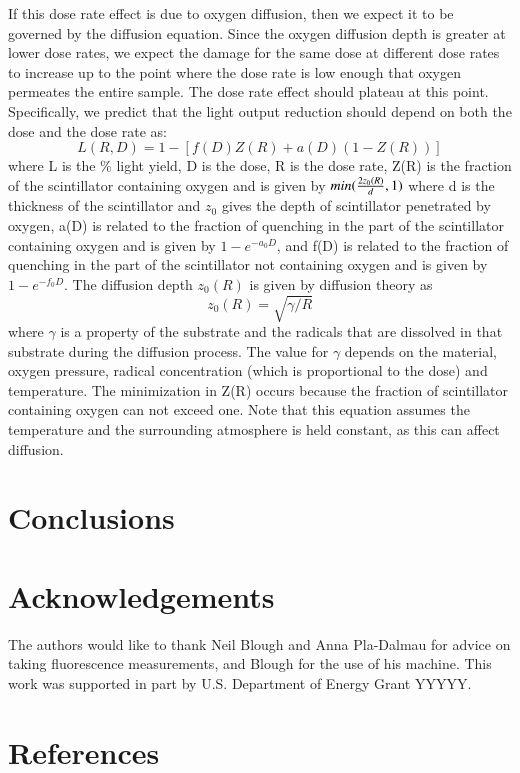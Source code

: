 \documentclass[review]{elsarticle}
\begin{document}
If this dose rate effect is due to oxygen diffusion, then
we expect it to be governed by the diffusion equation.  Since
the oxygen diffusion depth is greater at lower dose rates,
we expect the damage for the same dose at different dose rates to
increase up to the point where the dose rate is low enough that oxygen
permeates the entire sample.  The dose rate effect should plateau
at this point.  Specifically, we predict that the light output
reduction should depend on both the dose and the dose rate as:
$$ L(R,D) = 1 - [f(D)Z(R) + a(D)(1-Z(R))]$$
where L is the \% light yield, D is the dose, R is the dose rate, 
Z(R) is the fraction of the scintillator containing 
oxygen and is given by $min({{2 z_0(R)}\over{d}},1)$
where d is the thickness of the scintillator and $z_0$ gives
the depth of scintillator penetrated by oxygen,
a(D) is related to the fraction of quenching in the part of
the scintillator containing oxygen and is given by $1-e^{-a_0 D}$, 
and
f(D) is related to the fraction of quenching in the part of
the scintillator not containing oxygen and is given by $1-e^{-f_0 D}$.
The diffusion depth $z_0(R)$ is given by diffusion theory as 
$$z_0(R)=\sqrt{\gamma/R}$$
where $\gamma$ is a property of the substrate and the radicals that
are dissolved in that substrate during the diffusion process.
The value for $\gamma$ depends on the material, oxygen pressure,
radical concentration (which is proportional to the dose) and 
temperature.
The minimization in Z(R) occurs because the fraction of scintillator
containing oxygen can not exceed one.  Note that this equation 
assumes the temperature and the surrounding atmosphere
is held constant, as this can 
affect diffusion.


\section{Conclusions}

\section{Acknowledgements}
The authors would like to thank Neil Blough and Anna Pla-Dalmau for advice on taking fluorescence measurements, and Blough for the use of his machine.  This work was supported in part by U.S. Department of Energy Grant YYYYY.

\section*{References}


\end{document}
